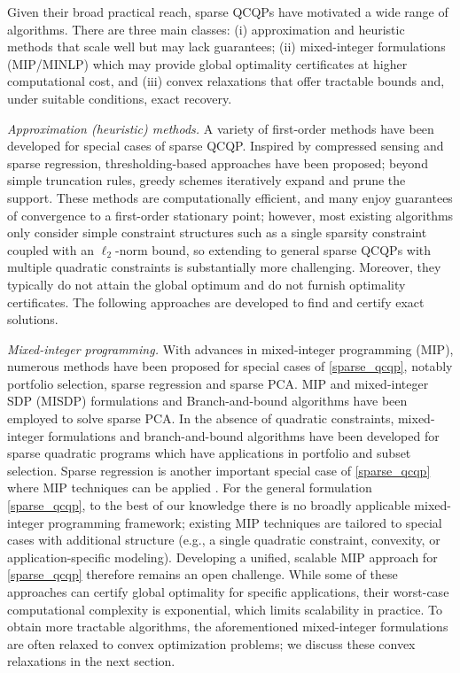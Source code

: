 \documentclass[11pt]{amsart}
\theoremstyle{plain}
\theoremstyle{definition}
\theoremstyle{remark}
\begin{document}
	Given their broad practical reach, sparse QCQPs have motivated a wide range of algorithms. There are three main classes: (i) approximation and heuristic methods that scale well but may lack guarantees; (ii) mixed-integer formulations (MIP/MINLP) which may provide global optimality certificates at higher computational cost, and (iii) convex relaxations that offer tractable bounds and, under suitable conditions, exact recovery.
	
	\textit{Approximation (heuristic) methods.}
	A variety of first-order methods have been developed for special cases of sparse QCQP. Inspired by compressed sensing and sparse regression, thresholding-based approaches \cite{journee2010generalized, hein2010inverse,yuan2013truncated,luss2013conditional,yuan2018gradient} have been proposed; beyond simple truncation rules, greedy schemes \cite{tropp2007signal,bahmani2013greedy,tropp2004greed,xie2020scalable} iteratively expand and prune the support. These methods are computationally efficient, and many enjoy guarantees of convergence to a first-order stationary point; however, most existing algorithms only consider simple constraint structures such as a single sparsity constraint coupled with an $\ell_2$-norm bound, so extending to general sparse QCQPs with multiple quadratic constraints is substantially more challenging. Moreover, they typically do not attain the global optimum and do not furnish optimality certificates. The following approaches are developed to find and certify 
	exact solutions.
	
	\textit{Mixed-integer programming.}
	With advances in mixed-integer programming (MIP), numerous methods have been proposed for special cases of \eqref{sparse_qcqp}, notably portfolio selection, sparse regression and sparse PCA. MIP and mixed-integer SDP (MISDP) formulations \cite{gally2018framework,li2025exact,bertsimas2022solving,dey2022using} and Branch-and-bound algorithms \cite{moghaddam2005spectral,berk2019certifiably}  have been employed to solve sparse PCA. In the absence of quadratic constraints, mixed-integer formulations \cite{zheng2014improving} and branch-and-bound algorithms \cite{bertsimas2009algorithm} have been developed for sparse quadratic programs which have applications in portfolio and subset selection. Sparse regression is another important special case of \eqref{sparse_qcqp} where MIP techniques can be applied \cite{bertsimas2020sparse,bertsimas2021sparse,atamturk2025rank}. For the general formulation \eqref{sparse_qcqp}, to the best of our knowledge there is no broadly applicable mixed-integer programming framework; existing MIP techniques are tailored to special cases with additional structure (e.g., a single quadratic constraint, convexity, or application-specific modeling). Developing a unified, scalable MIP approach for \eqref{sparse_qcqp} therefore remains an open challenge. While some of these approaches can certify global optimality for specific applications, their worst-case computational complexity is exponential, which limits scalability in practice. To obtain more tractable algorithms, the aforementioned mixed-integer formulations are often relaxed to convex optimization problems; we discuss these convex relaxations in the next section.
	
\end{document}

